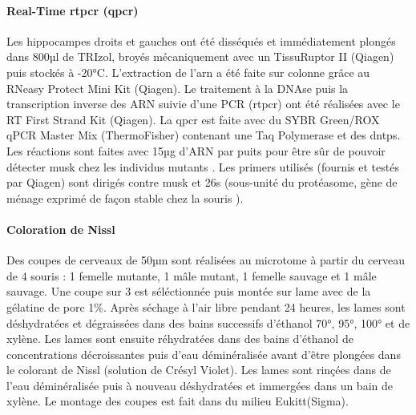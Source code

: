 \paragraph{Real-Time \acrshort{rtpcr} (\acrshort{qpcr})}
\label{par:qPCR}
	Les hippocampes droits et gauches ont été disséqués et immédiatement plongés dans 800µl de TRIzol\textregistered, broyés mécaniquement avec un TissuRuptor II (Qiagen\textregistered) puis stockés à -20°C. L'extraction de l'\acrshort{arn} a été faite sur colonne grâce au RNeasy Protect Mini Kit (Qiagen\textregistered). Le traitement à la DNAse puis la transcription inverse des ARN suivie d'une PCR (\acrshort{rtpcr}) ont été réalisées avec le RT First Strand Kit (Qiagen\textregistered). La \gls{qpcr} est faite avec du SYBR Green/ROX qPCR Master Mix (ThermoFisher\textregistered) contenant une Taq Polymerase et des \glspl{dntp}. Les réactions sont faites avec 15µg d'ARN par puits pour être sûr de pouvoir détecter \gls{musk} chez les individus mutants . Les primers utilisés (fournis et testés par Qiagen\textregistered) sont dirigés contre \gls{musk} et \acrshort{26s} (sous-unité du protéasome, gène de ménage exprimé de façon stable chez la souris \cite{Wang2017}).
	
\paragraph{Coloration de Nissl}
\label{par:Nissl}
	Des coupes de cerveaux de 50µm sont réalisées au microtome à partir du cerveau de 4 souris : 1 femelle mutante, 1 mâle mutant, 1 femelle sauvage et 1 mâle sauvage. Une coupe sur 3 est séléctionnée puis montée sur lame avec de la gélatine de porc 1\%. Après séchage à l'air libre pendant 24 heures, les lames sont déshydratées et dégraissées dans des bains successifs d'éthanol 70°, 95°, 100° et de xylène. Les lames sont ensuite réhydratées dans des bains d'éthanol de concentrations décroissantes puis d'eau déminéralisée avant d'être plongées dans le colorant de Nissl (solution de Crésyl Violet).  Les lames sont rinçées dans de l'eau déminéralisée puis à nouveau déshydratées et immergées dans un bain de xylène. Le montage des coupes est fait dans du milieu Eukitt\textregistered (Sigma).
	
